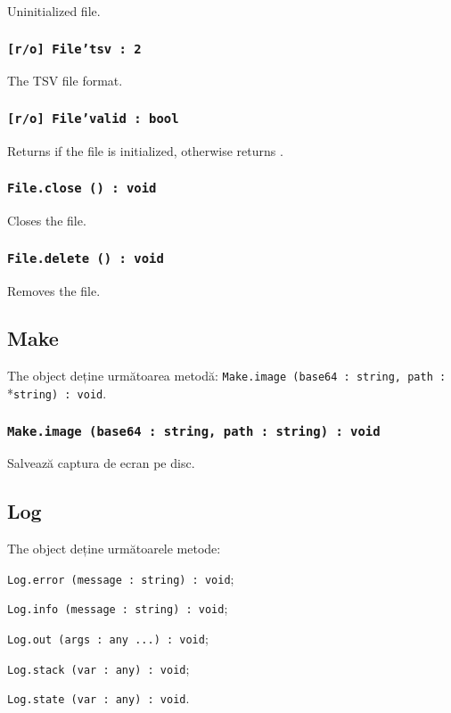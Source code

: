 Uninitialized file.

\subsubsection{\texttt{[r/o] File'tsv : 2}}

The TSV file format.

\subsubsection{\texttt{[r/o] File'valid : bool}}

Returns \true{} if the file is initialized, otherwise returns \false.

\subsubsection{\texttt{File.close () : void}}

Closes the file.

\subsubsection{\texttt{File.delete () : void}}

Removes the file.

\subsection{{\color{orange} Make}}

The object \make{} deține următoarea metodă: \texttt{Make.image (base64 : string, path :}\\*\texttt{string) : void}.

\subsubsection{\texttt{Make.image (base64 : string, path : string) : void}}

Salvează captura de ecran pe disc.

\subsection{{\color{orange} Log}}

The object \logtype{} deține următoarele metode:
\begin{icItems}
	\item \texttt{Log.error (message : string) : void};
	\item \texttt{Log.info (message : string) : void};
	\item \texttt{Log.out (args : any ...) : void};
	\item \texttt{Log.stack (var : any) : void};
	\item \texttt{Log.state (var : any) : void}.
\end{icItems}

